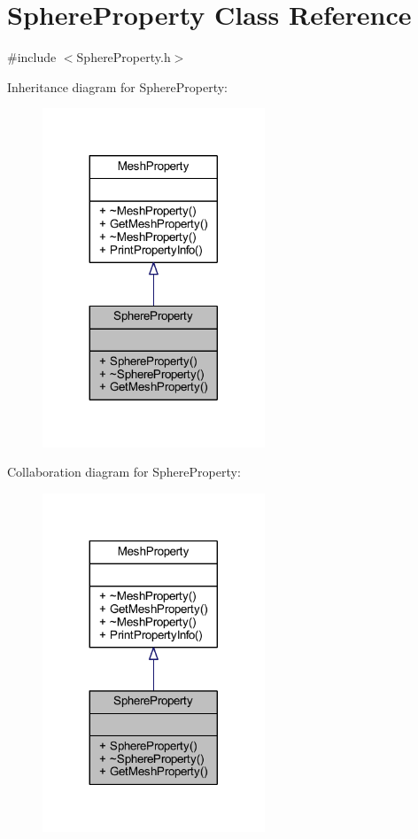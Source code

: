\hypertarget{class_sphere_property}{}\section{Sphere\+Property Class Reference}
\label{class_sphere_property}


{\ttfamily \#include $<$Sphere\+Property.\+h$>$}



Inheritance diagram for Sphere\+Property\+:\nopagebreak
\begin{figure}[H]
\begin{center}
\leavevmode
\includegraphics[width=188pt]{class_sphere_property__inherit__graph}
\end{center}
\end{figure}


Collaboration diagram for Sphere\+Property\+:\nopagebreak
\begin{figure}[H]
\begin{center}
\leavevmode
\includegraphics[width=188pt]{class_sphere_property__coll__graph}
\end{center}
\end{figure}

